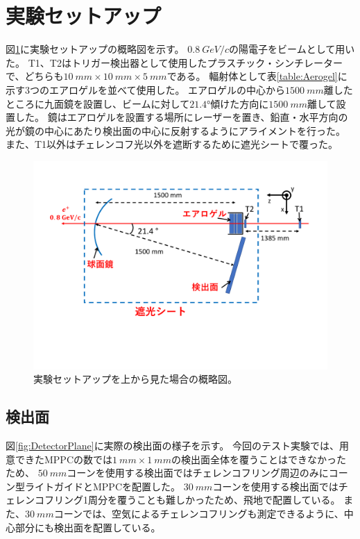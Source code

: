 \section{実験セットアップ}
図\ref{fig:ELPHSetup}に実験セットアップの概略図を示す。
$\SI{0.8}{GeV/c}$の陽電子をビームとして用いた。
T1、T2はトリガー検出器として使用したプラスチック・シンチレーターで、どちらも$\SI{10}{mm}\times\SI{10}{mm}\times\SI{5}{mm}$である。
輻射体として表\ref{table:Aerogel}に示す3つのエアロゲルを並べて使用した。
エアロゲルの中心から$\SI{1500}{mm}$離したところに九面鏡を設置し、ビームに対して$\ang{21.4}$傾けた方向に$\SI{1500}{mm}$離して設置した。
鏡はエアロゲルを設置する場所にレーザーを置き、鉛直・水平方向の光が鏡の中心にあたり検出面の中心に反射するようにアライメントを行った。
また、T1以外はチェレンコフ光以外を遮断するために遮光シートで覆った。
\begin{figure}
  \centering
  \includegraphics[width=15cm]{images/chapter3/ELPHSetup.pdf}
  \caption{実験セットアップを上から見た場合の概略図。}
  \label{fig:ELPHSetup}
\end{figure}

\subsection{検出面}
図\ref{fig:DetectorPlane}に実際の検出面の様子を示す。
今回のテスト実験では、用意できたMPPCの数では$\SI{1}{mm}\times\SI{1}{mm}$の検出面全体を覆うことはできなかったため、
$\SI{50}{mm}$コーンを使用する検出面ではチェレンコフリング周辺のみにコーン型ライトガイドとMPPCを配置した。
$\SI{30}{mm}$コーンを使用する検出面ではチェレンコフリング1周分を覆うことも難しかったため、飛地で配置している。
また、$\SI{30}{mm}$コーンでは、空気によるチェレンコフリングも測定できるように、中心部分にも検出面を配置している。

